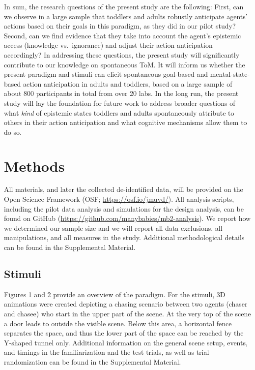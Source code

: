 \documentclass[
  english,
  man,floatsintext]{apa6}
\begin{document}
In sum, the research questions of the present study are the following: First, can we observe in a large sample that toddlers and adults robustly anticipate agents' actions based on their goals in this paradigm, as they did in our pilot study? Second, can we find evidence that they take into account the agent's epistemic access (knowledge vs.~ignorance) and adjust their action anticipation accordingly? In addressing these questions, the present study will significantly contribute to our knowledge on spontaneous ToM. It will inform us whether the present paradigm and stimuli can elicit spontaneous goal-based and mental-state-based action anticipation in adults and toddlers, based on a large sample of about 800 participants in total from over 20 labs. In the long run, the present study will lay the foundation for future work to address broader questions of what \emph{kind} of epistemic states toddlers and adults spontaneously attribute to others in their action anticipation and what cognitive mechanisms allow them to do so.

\hypertarget{methods}{%
\section{Methods}\label{methods}}

All materials, and later the collected de-identified data, will be provided on the Open Science Framework (OSF; \url{https://osf.io/jmuvd/}). All analysis scripts, including the pilot data analysis and simulations for the design analysis, can be found on GitHub (\url{https://github.com/manybabies/mb2-analysis}). We report how we determined our sample size and we will report all data exclusions, all manipulations, and all measures in the study. Additional methodological details can be found in the Supplemental Material.

\hypertarget{stimuli}{%
\subsection{Stimuli}\label{stimuli}}

Figures 1 and 2 provide an overview of the paradigm. For the stimuli, 3D animations were created depicting a chasing scenario between two agents (chaser and chasee) who start in the upper part of the scene. At the very top of the scene a door leads to outside the visible scene. Below this area, a horizontal fence separates the space, and thus the lower part of the space can be reached by the Y-shaped tunnel only. Additional information on the general scene setup, events, and timings in the familiarization and the test trials, as well as trial randomization can be found in the Supplemental Material.
\end{document}
